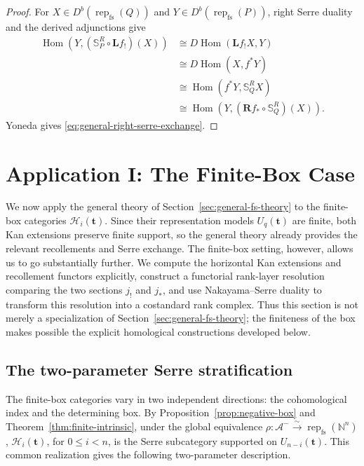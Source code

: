 \documentclass[10pt,a4paper]{amsart}
\newcommand{\Rep}{\operatorname{rep}}
\newcommand{\Hom}{\operatorname{Hom}}
\begin{document}
\begin{proof}
For $X\in D^b(\Rep_{\mathrm{fs}}(Q))$ and
$Y\in D^b(\Rep_{\mathrm{fs}}(P))$, right Serre duality and the derived
adjunctions give
\begin{align*}
\Hom(Y,(\mathbb S_P^R\circ\mathbf L f_!)(X))
&\cong D\Hom(\mathbf L f_!X,Y)\\
&\cong D\Hom(X,f^*Y)\\
&\cong\Hom(f^*Y,\mathbb S_Q^R X)\\
&\cong\Hom(Y,(\mathbf R f_*\circ\mathbb S_Q^R)(X)).
\end{align*}
Yoneda gives \eqref{eq:general-right-serre-exchange}.
\end{proof}

\section{Application I: The Finite-Box Case}
\label{sec:finite-box-recollement}

We now apply the general theory of Section~\ref{sec:general-fs-theory} to the
finite-box categories $\mathcal H_i(\mathbf t)$.  Since their representation
models $U_q(\mathbf t)$ are finite, both Kan extensions preserve finite support,
so the general theory already provides the relevant recollements and Serre
exchange.  The finite-box setting, however, allows us to go substantially
further.  We compute the horizontal Kan extensions and recollement functors
explicitly, construct a functorial rank-layer resolution comparing the two
sections $j_!$ and $j_*$, and use Nakayama--Serre duality to transform this
resolution into a costandard rank complex.  Thus this section is not merely a
specialization of Section~\ref{sec:general-fs-theory}; the finiteness of the box
makes possible the explicit homological constructions developed below.

\subsection{The two-parameter Serre stratification}

The finite-box categories vary in two independent directions: the
cohomological index and the determining box.  By
Proposition~\ref{prop:negative-box} and
Theorem~\ref{thm:finite-intrinsic}, under the global equivalence
$\rho:\mathcal A^-\xrightarrow{\sim}\Rep_{\mathrm{fs}}(\mathbb N^n)$,
$\mathcal H_i(\mathbf t)$, for $0\le i<n$, is the Serre subcategory supported
on $U_{n-i}(\mathbf t)$.  This common realization gives the following
two-parameter description.
\end{document}
